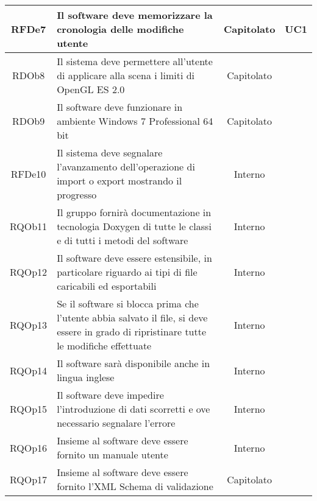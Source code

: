 \begin{longtable}{|c|p{6cm}|c|c|}
\midrule
RFDe7
& Il software deve memorizzare la cronologia delle modifiche utente
& Capitolato
& UC1
\\


\midrule
RDOb8
& Il sistema deve permettere all'utente di applicare alla scena i limiti di OpenGL ES 2.0
& Capitolato
&
\\


\midrule
RDOb9
& Il software deve funzionare in ambiente Windows 7 Professional 64 bit
& Capitolato
&
\\


\midrule
RFDe10
& Il sistema deve segnalare l'avanzamento dell'operazione di import o export mostrando il progresso
& Interno
&
\\


\midrule
RQOb11
& Il gruppo fornirà documentazione in tecnologia Doxygen di tutte le classi e di tutti i metodi del software
& Interno
&
\\


\midrule
RQOp12
& Il software deve essere estensibile, in particolare riguardo ai tipi di file caricabili ed esportabili
& Interno
&
\\


\midrule
RQOp13
& Se il software si blocca prima che l'utente abbia salvato il file, si deve essere in grado di ripristinare tutte le modifiche effettuate
& Interno
&
\\


\midrule
RQOp14
& Il software sarà disponibile anche in lingua inglese
& Interno
&
\\


\midrule
RQOp15
& Il software deve impedire l'introduzione di dati scorretti e ove necessario segnalare l'errore
& Interno
&
\\


\midrule
RQOp16
& Insieme al software deve essere fornito un manuale utente
& Interno
&
\\


\midrule
RQOp17
& Insieme al software deve essere fornito l'XML Schema di validazione
& Capitolato
&
\\




\end{longtable}

